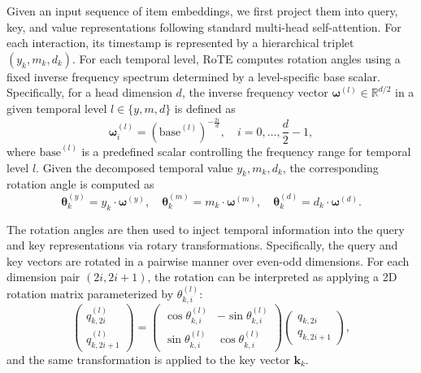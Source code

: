 \documentclass[sigconf,natbib=true]{acmart}
\begin{document}
Given an input sequence of item embeddings, we first project them into query, key, and value representations following standard multi-head self-attention.
For each interaction, its timestamp is represented by a hierarchical  triplet $(y_k, m_k, d_k)$.
For each temporal level, RoTE computes rotation angles using a fixed inverse frequency spectrum determined by a level-specific base scalar.
Specifically, for a head dimension $d$, the inverse frequency vector $\boldsymbol{\omega}^{(l)} \in \mathbb{R}^{d/2}$ in a given temporal level $l \in \{y, m, d\}$ is defined as
\begin{equation}
\boldsymbol{\omega}^{(l)}_i = \left(\text{base}^{(l)}\right)^{- \frac{2i}{d}}, \quad i = 0, \dots, \frac{d}{2}-1,
\end{equation}
where $\text{base}^{(l)}$ is a predefined scalar controlling the frequency range for temporal level $l$.
Given the decomposed temporal value $y_k, m_k, d_k$, the corresponding rotation angle is computed as
\begin{equation}
\boldsymbol{\theta}_k^{(y)} = y_k \cdot \boldsymbol{\omega}^{(y)}, \quad
\boldsymbol{\theta}_k^{(m)} = m_k \cdot \boldsymbol{\omega}^{(m)}, \quad
\boldsymbol{\theta}_k^{(d)} = d_k \cdot \boldsymbol{\omega}^{(d)}.
\end{equation}

The rotation angles are then used to inject temporal information into the query and key representations via rotary transformations.
Specifically, the query and key vectors are rotated in a pairwise manner over even-odd dimensions.
For each dimension pair $(2i, 2i+1)$, the rotation can be interpreted as applying a 2D rotation matrix parameterized by $\theta_{k,i}^{(l)}$:
\begin{equation}
\begin{pmatrix}
q_{k,2i}^{(l)} \\
q_{k,2i+1}^{(l)}
\end{pmatrix}
=
\begin{pmatrix}
\cos \theta_{k,i}^{(l)} & -\sin \theta_{k,i}^{(l)} \\
\sin \theta_{k,i}^{(l)} & \cos \theta_{k,i}^{(l)}
\end{pmatrix}
\begin{pmatrix}
q_{k,2i} \\
q_{k,2i+1}
\end{pmatrix},
\end{equation}
and the same transformation is applied to the key vector $\mathbf{k}_k$.
\end{document}
